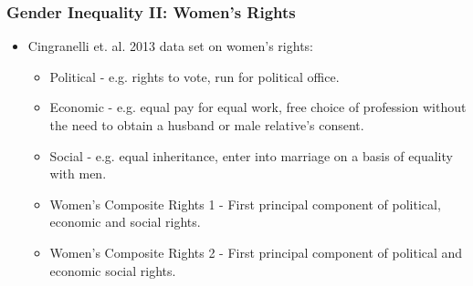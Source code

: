 \documentclass[10pt,letterpaper,subeqn]{beamer}
\begin{document}
\begin{frame}[label=WomensRights]
\frametitle{Gender Inequality II: Women's Rights}
\begin{itemize}
	\item Cingranelli et. al. 2013 data set on women's rights:
	 \vspace{4mm}
	\begin{itemize}
		\item Political - e.g. rights to vote, run for political office.
		 \vspace{4mm}
		\item Economic - e.g. equal pay for equal work, free choice of profession without the need to obtain a husband or male relative's consent.
		 \vspace{4mm}
		\item Social - e.g. equal inheritance, enter into marriage on a basis of equality with men.
				 \vspace{4mm}
		\item Women's Composite Rights 1 - First principal component of political, economic and social rights.
				 \vspace{4mm}
		\item Women's Composite Rights 2 - First principal component of political and economic social rights.

	\end{itemize}
\end{itemize}

\end{frame}

\end{document}
